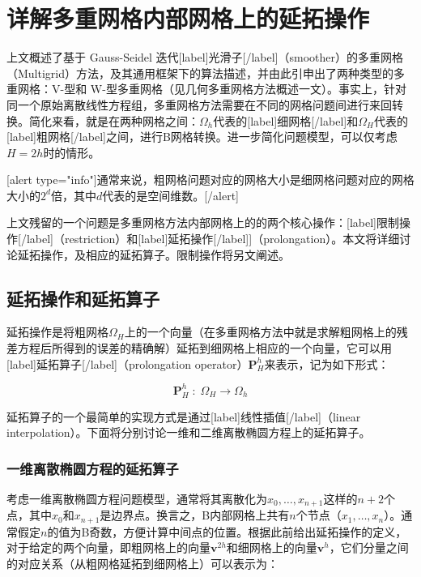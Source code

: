 \documentclass[12pt, UTF8, nofonts]{ctexart}
\begin{document}

\section*{详解多重网格内部网格上的延拓操作}

上文概述了基于 Gauss-Seidel 迭代[label]光滑子[/label]（smoother）的多重网格（Multigrid）方法，及其通用框架下的算法描述，并由此引申出了两种类型的多重网格：V-型和 W-型多重网格（见几何多重网格方法概述一文）。事实上，针对同一个原始离散线性方程组，多重网格方法需要在不同的网格问题间进行来回转换。简化来看，就是在两种网格之间：$\Omega_h$代表的[label]细网格[/label]和$\Omega_{H}$代表的[label]粗网格[/label]之间，进行B网格转换。进一步简化问题模型，可以仅考虑$H=2h$时的情形。

[alert type="info"]通常来说，粗网格问题对应的网格大小是细网格问题对应的网格大小的$2^d$倍，其中$d$代表的是空间维数。[/alert]

上文残留的一个问题是多重网格方法内部网格上的的两个核心操作：[label]限制操作[/label]（restriction）和[label]延拓操作[/label]]（prolongation）。本文将详细讨论延拓操作，及相应的延拓算子。限制操作将另文阐述。

\subsection*{延拓操作和延拓算子}

延拓操作是将粗网格$\Omega_H$上的一个向量（在多重网格方法中就是求解粗网格上的残差方程后所得到的误差的精确解）延拓到细网格上相应的一个向量，它可以用[label]延拓算子[/label]（prolongation operator）$\boldsymbol{P}_H^h$来表示，记为如下形式：

\begin{equation}
  \label{eq:prolong}
  \boldsymbol{P}_H^h\;:\;\Omega_H \to \Omega_h
\end{equation}

延拓算子的一个最简单的实现方式是通过[label]线性插值[/label]（linear interpolation）。下面将分别讨论一维和二维离散椭圆方程上的延拓算子。

\subsubsection*{一维离散椭圆方程的延拓算子}

考虑一维离散椭圆方程问题模型，通常将其离散化为$x_0,\ldots,x_{n+1}$这样的$n+2$个点，其中$x_0$和$x_{n+1}$是边界点。换言之，B内部网格上共有$n$个节点（$x_1,\ldots,x_n$）。通常假定$n$的值为B奇数，方便计算中间点的位置。根据此前给出延拓操作的定义，对于给定的两个向量，即粗网格上的向量$\boldsymbol{v}^{2h}$和细网格上的向量$\boldsymbol{v}^h$，它们分量之间的对应关系（从粗网格延拓到细网格上）可以表示为：
\end{document}
